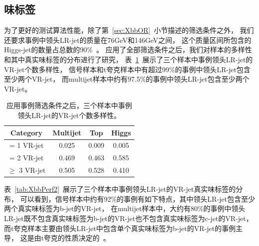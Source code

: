 


\subsection{味标签}
\label{sec:XbbPerf2}


为了更好的测试算法性能，除了第~\ref{sec:XbbOR}~小节描述的筛选条件之外，
我们还要求事例中领头LR-jet的质量在76GeV和146GeV之间，
这个质量区间所包含的Higgs-jet的数量占总数的90\%~\cite{TAGGING5}。
应用了全部筛选条件之后，我们对样本的多样性和其中真实味标签的分布进行了研究，
表~\ref{tab:XbbPerf1}~展示了三个样本中事例领头LR-jet的VR-jet个数多样性，
信号样本和t夸克样本中有超过99\%的事例中领头LR-jet包含至少两个VR-jet，
而multijet样本中约有97.5\%的事例中领头LR-jet包含至少两个VR-jet。

\begin{table}
\begin{center}
  \begin{tabular}{ c|c c c }
    \hline
    \hline
    Category & Multijet & Top & Higgs \\
    \hline
    = 1 VR-jet  & 0.025  & 0.009  & 0.005 \\ 
    \hline
    = 2 VR-jet & 0.469  & 0.463  & 0.585 \\ 
    \hline
    $\geq$ 3 VR-jet & 0.505  & 0.528  & 0.410 \\ 
    \hline
    \hline
  \end{tabular}
  \caption{
  应用事例筛选条件之后，三个样本中事例领头LR-jet的VR-jet个数多样性。
      }
\label{tab:XbbPerf1}
\end{center}
\end{table}

表~\ref{tab:XbbPerf2}~展示了三个样本中事例领头LR-jet的VR-jet真实味标签的分布，
可以看到，信号样本中约有92\%的事例有如下特点，其中领头LR-jet包含至少两个真实味标签为b-jet的VR-jet，
在multijet样本中，大约有80\%的事例中领头LR-jet既不包含真实味标签为b-jet的VR-jet也不包含真实味标签为c-jet的VR-jet，
而t夸克样本主要由领头LR-jet中包含单个真实味标签为b-jet的VR-jet的事例主导，
这是由t夸克的性质决定的~\cite{PDG}。


